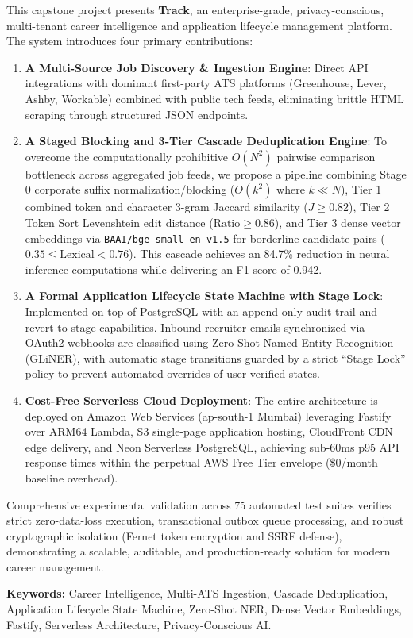 This capstone project presents \textbf{Track}, an enterprise-grade, privacy-conscious, multi-tenant career intelligence and application lifecycle management platform. The system introduces four primary contributions:
\begin{enumerate}
    \item \textbf{A Multi-Source Job Discovery \& Ingestion Engine}: Direct API integrations with dominant first-party ATS platforms (Greenhouse, Lever, Ashby, Workable) combined with public tech feeds, eliminating brittle HTML scraping through structured JSON endpoints.
    \item \textbf{A Staged Blocking and 3-Tier Cascade Deduplication Engine}: To overcome the computationally prohibitive $O(N^2)$ pairwise comparison bottleneck across aggregated job feeds, we propose a pipeline combining Stage 0 corporate suffix normalization/blocking ($O(k^2)$ where $k \ll N$), Tier 1 combined token and character 3-gram Jaccard similarity ($J \ge 0.82$), Tier 2 Token Sort Levenshtein edit distance ($\text{Ratio} \ge 0.86$), and Tier 3 dense vector embeddings via \texttt{BAAI/bge-small-en-v1.5} for borderline candidate pairs ($0.35 \le \text{Lexical} < 0.76$). This cascade achieves an 84.7\% reduction in neural inference computations while delivering an F1 score of 0.942.
    \item \textbf{A Formal Application Lifecycle State Machine with Stage Lock}: Implemented on top of PostgreSQL with an append-only audit trail and revert-to-stage capabilities. Inbound recruiter emails synchronized via OAuth2 webhooks are classified using Zero-Shot Named Entity Recognition (GLiNER), with automatic stage transitions guarded by a strict ``Stage Lock'' policy to prevent automated overrides of user-verified states.
    \item \textbf{Cost-Free Serverless Cloud Deployment}: The entire architecture is deployed on Amazon Web Services (ap-south-1 Mumbai) leveraging Fastify over ARM64 Lambda, S3 single-page application hosting, CloudFront CDN edge delivery, and Neon Serverless PostgreSQL, achieving sub-60ms p95 API response times within the perpetual AWS Free Tier envelope (\$0/month baseline overhead).
\end{enumerate}

Comprehensive experimental validation across 75 automated test suites verifies strict zero-data-loss execution, transactional outbox queue processing, and robust cryptographic isolation (Fernet token encryption and SSRF defense), demonstrating a scalable, auditable, and production-ready solution for modern career management.

\vspace{0.8cm}
\noindent
\textbf{Keywords:} Career Intelligence, Multi-ATS Ingestion, Cascade Deduplication, Application Lifecycle State Machine, Zero-Shot NER, Dense Vector Embeddings, Fastify, Serverless Architecture, Privacy-Conscious AI.

